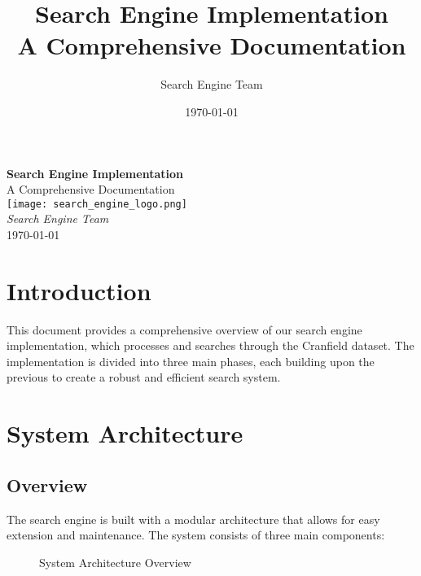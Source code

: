 \documentclass[12pt,a4paper]{article}
\title{\Huge\textbf{Search Engine Implementation}\\[0.5em]
\Large A Comprehensive Documentation}
\author{Search Engine Team}
\date{\today}
\begin{document}
\begin{titlepage}
    \centering
    \vspace*{2cm}
    {\Huge\textbf{Search Engine Implementation}\\[1em]
    \Large A Comprehensive Documentation}\\[2em]
    \texttt{[image: search\_engine\_logo.png]}\\[2em]
    \Large\textit{Search Engine Team}\\[1em]
    \large\today
\end{titlepage}

\tableofcontents
\newpage

\section{Introduction}
This document provides a comprehensive overview of our search engine implementation, which processes and searches through the Cranfield dataset. The implementation is divided into three main phases, each building upon the previous to create a robust and efficient search system.

\section{System Architecture}
\subsection{Overview}
The search engine is built with a modular architecture that allows for easy extension and maintenance. The system consists of three main components:

\begin{figure}[H]
    \centering
    \caption{System Architecture Overview}
\end{figure}
\end{document}
